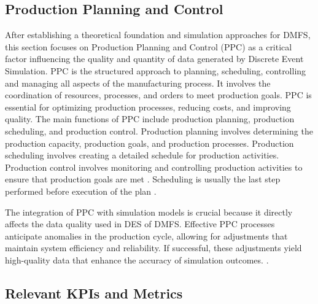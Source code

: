 \subsection{Production Planning and Control}
After establishing a theoretical foundation and simulation approaches for DMFS, this section focuses on Production Planning and Control (PPC) as a critical factor influencing the quality and quantity of data generated by Discrete Event Simulation.
PPC is the structured approach to planning, scheduling, controlling and managing all aspects of the manufacturing process. It involves the coordination of resources, processes, and orders to meet production goals. PPC is essential for optimizing production processes, reducing costs, and improving quality. The main functions of PPC include production planning, production scheduling, and production control. Production planning involves determining the production capacity, production goals, and production processes. Production scheduling involves creating a detailed schedule for production activities. Production control involves monitoring and controlling production activities to ensure that production goals are met \parencite{kiran2019production}. Scheduling is usually the last step performed before execution of the plan \parencite{pinedo2012design}.

The integration of PPC with simulation models is crucial because it directly affects the data quality used in DES of DMFS. Effective PPC processes anticipate anomalies in the production cycle, allowing for adjustments that maintain system efficiency and reliability. If successful, these adjustments yield high-quality data that enhance the accuracy of simulation outcomes. \parencite{kiran2019production}.


\subsection{Relevant KPIs and Metrics}

